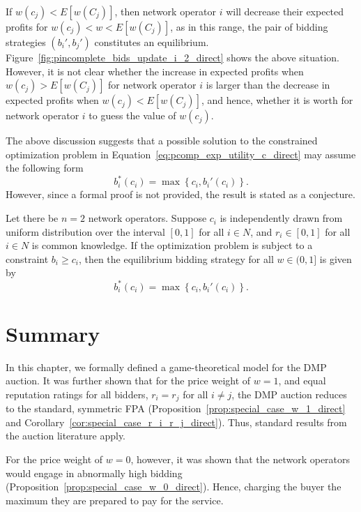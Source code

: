 If $w(c_j) < E[w(C_j)]$, then network operator $i$ will decrease their expected profits for $w(c_j) < w < E[w(C_j)]$, as in this range, the pair of bidding strategies $(b_i',b_j')$ constitutes an equilibrium. Figure~\ref{fig:pincomplete_bids_update_i_2_direct} shows the above situation. However, it is not clear whether the increase in expected profits when $w(c_j) > E[w(C_j)]$ for network operator $i$ is larger than the decrease in expected profits when $w(c_j) < E[w(C_j)]$, and hence, whether it is worth for network operator $i$ to guess the value of $w(c_j)$.

The above discussion suggests that a possible solution to the constrained optimization problem in Equation~\eqref{eq:pcomp_exp_utility_c_direct} may assume the following form
\begin{equation*}
	b_i^*(c_i) = \max\left\{ c_i, b_i'(c_i) \right\}.
\end{equation*}
However, since a formal proof is not provided, the result is stated as a conjecture.
\begin{conjecture}
\label{conj:pcomp_max_equi_bidding_str_direct}
Let there be $n=2$ network operators. Suppose $c_i$ is independently drawn from uniform distribution over the interval $[0,1]$ for all $i\in N$, and $r_i\in [0,1]$ for all $i\in N$ is common knowledge. If the optimization problem is subject to a constraint $b_i\ge c_i$, then the equilibrium bidding strategy for all $w\in (0,1]$ is given by
\begin{equation}
\label{eq:pcomp_equi_bidding_str_max_direct}
	b_i^*(c_i) = \max\left\{ c_i, b_i'(c_i) \right\}.
\end{equation}
\end{conjecture}

\section{Summary} %
\label{sec:summary_direct}
In this chapter, we formally defined a game-theoretical model for the DMP auction. It was further shown that for the price weight of $w=1$, and equal reputation ratings for all bidders, $r_i=r_j$ for all $i\neq j$, the DMP auction reduces to the standard, symmetric FPA (Proposition~\ref{prop:special_case_w_1_direct} and Corollary~\ref{cor:special_case_r_i_r_j_direct}). Thus, standard results from the auction literature apply.

For the price weight of $w=0$, however, it was shown that the network operators would engage in abnormally high bidding (Proposition~\ref{prop:special_case_w_0_direct}). Hence, charging the buyer the maximum they are prepared to pay for the service.

